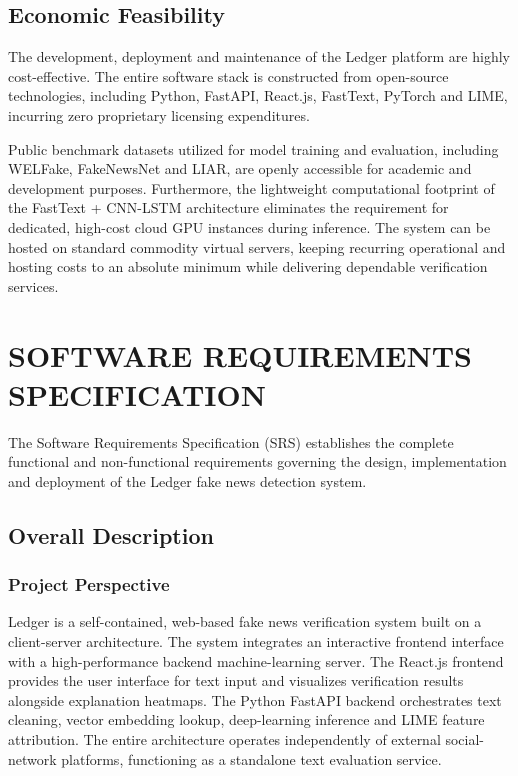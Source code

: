 \documentclass[12pt,a4paper,oneside]{report}
\begin{document}
\section{Economic Feasibility}

The development, deployment and maintenance of the Ledger platform are highly cost-effective.
The entire software stack is constructed from open-source technologies, including Python,
FastAPI, React.js, FastText, PyTorch and LIME, incurring zero proprietary licensing expenditures.

Public benchmark datasets utilized for model training and evaluation, including WELFake,
FakeNewsNet and LIAR, are openly accessible for academic and development purposes. Furthermore,
the lightweight computational footprint of the FastText + CNN-LSTM architecture eliminates the
requirement for dedicated, high-cost cloud GPU instances during inference. The system can be hosted
on standard commodity virtual servers, keeping recurring operational and hosting costs to an
absolute minimum while delivering dependable verification services.

\chapter{SOFTWARE REQUIREMENTS SPECIFICATION}

The Software Requirements Specification (SRS) establishes the complete functional and
non-functional requirements governing the design, implementation and deployment of the Ledger
fake news detection system.

\section{Overall Description}

\subsection{Project Perspective}

Ledger is a self-contained, web-based fake news verification system built on a client-server
architecture. The system integrates an interactive frontend interface with a high-performance
backend machine-learning server. The React.js frontend provides the user interface for text input
and visualizes verification results alongside explanation heatmaps. The Python FastAPI backend
orchestrates text cleaning, vector embedding lookup, deep-learning inference and LIME feature
attribution. The entire architecture operates independently of external social-network platforms,
functioning as a standalone text evaluation service.
\end{document}
